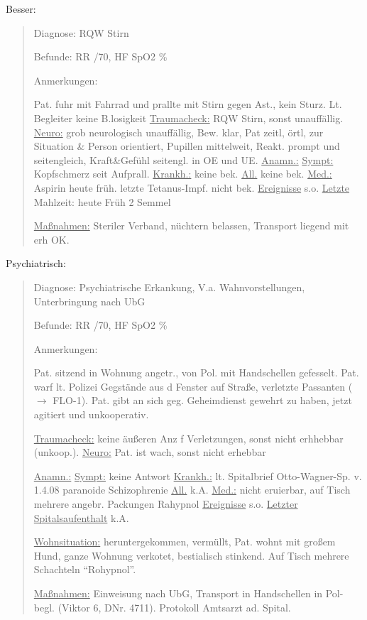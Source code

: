 Besser:

\begin{quote}
{\sffamily Diagnose:} {\ttfamily RQW Stirn}

{\sffamily Befunde:} {\sffamily RR} {/70,}
{\sffamily HF} {} {\sffamily SpO2}
{\% }

{\sffamily Anmerkungen:} {\ttfamily Pat. fuhr mit Fahrrad
und prallte mit Stirn gegen Ast., kein Sturz. Lt. Begleiter
keine B.losigkeit \underline{Traumacheck:} RQW Stirn, sonst unauffällig.
\underline{Neuro:} grob neurologisch unauffällig, Bew.
klar, Pat zeitl, örtl, zur Situation \& Person orientiert, Pupillen
mittelweit, Reakt. prompt und seitengleich, Kraft\&Gefühl
seitengl. in OE und UE. \underline{Anamn.:} \underline{Sympt:} Kopfschmerz seit
Aufprall. \underline{Krankh.:} keine bek. \underline{All.}
keine bek. \underline{Med.:} Aspirin heute früh. letzte
Tetanus-Impf. nicht bek. \underline{Ereignisse} s.o.
\underline{Letzte} Mahlzeit: heute Früh 2 Semmel

\underline{Maßnahmen:} Steriler Verband, nüchtern belassen,
Transport liegend mit erh OK.}
\end{quote}

Psychiatrisch:

\begin{quote}
{\sffamily Diagnose:} {\ttfamily Psychiatrische Erkankung,
V.a. Wahnvorstellungen, Unterbringung nach UbG}

{\sffamily Befunde:} {\sffamily RR} {/70,}
{\sffamily HF} {} {\sffamily SpO2}
{\% }

{\sffamily Anmerkungen:} {\ttfamily Pat. sitzend in Wohnung angetr., von Pol. mit Handschellen
gefesselt. Pat. warf lt. Polizei Gegstände aus d Fenster
auf Straße, verletzte Passanten ($\rightarrow$ FLO-1). Pat.
gibt an sich geg. Geheimdienst gewehrt zu haben,
jetzt agitiert und unkooperativ. 

\underline{Traumacheck:} keine äußeren Anz f Verletzungen,
sonst nicht erhhebbar (unkoop.). \underline{Neuro:} Pat.
ist wach, sonst nicht erhebbar

\underline{Anamn.:} \underline{Sympt:} keine Antwort
\underline{Krankh.:} lt. Spitalbrief Otto-Wagner-Sp. v.
1.4.08 paranoide Schizophrenie \underline{All.} k.A.
\underline{Med.:} nicht eruierbar, auf Tisch mehrere
angebr. Packungen Rahypnol \underline{Ereignisse} s.o.
\underline{Letzter Spitalsaufenthalt} k.A.

\underline{Wohnsituation:} heruntergekommen, vermüllt, Pat.
wohnt mit großem Hund, ganze Wohnung verkotet, bestialisch
stinkend. Auf Tisch mehrere Schachteln "`Rohypnol"'.

\underline{Maßnahmen:} Einweisung nach UbG, Transport in
Handschellen in Pol-begl. (Viktor 6, DNr. 4711). Protokoll
Amtsarzt ad. Spital.}
\end{quote}



